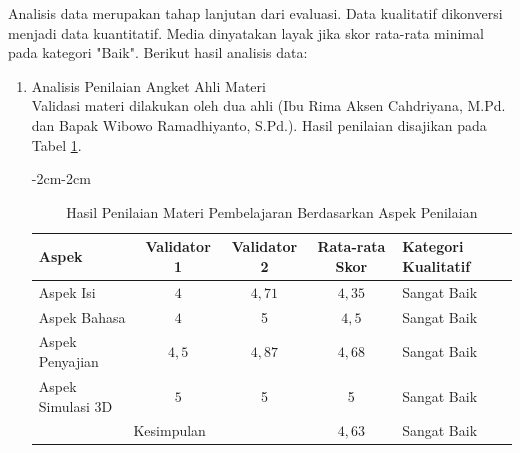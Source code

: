 \hspace{1cm}Analisis data merupakan tahap lanjutan dari evaluasi. Data kualitatif dikonversi menjadi data kuantitatif. Media dinyatakan layak jika skor rata-rata minimal pada kategori "Baik". Berikut hasil analisis data:
\begin{enumerate}
    \item Analisis Penilaian Angket Ahli Materi\\
    \hspace*{1cm}Validasi materi dilakukan oleh dua ahli (Ibu Rima Aksen Cahdriyana, M.Pd. dan Bapak Wibowo Ramadhiyanto, S.Pd.). Hasil penilaian disajikan pada Tabel \ref{penilaianmateri}.
    \begin{table}[H]
        \begin{adjustwidth}{-2cm}{-2cm}
            \centering
            \caption{Hasil Penilaian Materi Pembelajaran Berdasarkan Aspek Penilaian}
            \label{penilaianmateri}
            \begin{tabular}{|l|c|c|c|l|}
                \hline
                \textbf{Aspek} & \textbf{Validator 1} & \textbf{Validator 2} & \textbf{Rata-rata Skor} & \textbf{Kategori Kualitatif}\\
                \hline
                Aspek Isi & \(4\) & \(4{,}71\) & \(4{,}35\) & Sangat Baik\\
                Aspek Bahasa & \(4\) & 5 & \(4{,}5\) & Sangat Baik\\
                Aspek Penyajian & \(4{,}5\) & \(4{,}87\) & \(4{,}68\) & Sangat Baik\\
                Aspek Simulasi 3D & \(5\) & 5 & 5 & Sangat Baik\\
                \hline
                \multicolumn{3}{|c|}{Kesimpulan} & \(4{,}63\) & Sangat Baik\\
                \hline
            \end{tabular}
        \end{adjustwidth}
    \end{table}


\end{enumerate}
